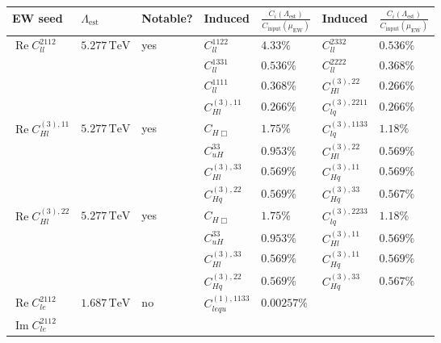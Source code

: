 \begin{table}[htbp]
    \centering
    \small
    \renewcommand{\arraystretch}{1.25}
    \begin{tabular}{lllllll}
        \toprule
        EW seed
        & \(\Lambda_{\mathrm{est}}\)
        & Notable?
        & Induced &$\tfrac{C_i(\Lambda_\text{est})}{C_\text{input}(\mu_\text{EW})}$ &Induced&$\tfrac{C_i(\Lambda_\text{est})}{C_\text{input}(\mu_\text{EW})}$
        \\
        \midrule
        \(\operatorname{Re}C_{ll}^{2112}\)
        & \(5.277\,\mathrm{TeV}\)
        & yes
        & \(C_{ll}^{1122}\)&\(4.33\%\)&
          \(C_{ll}^{2332}\)&\(0.536\%\)\\&&&
          \(C_{ll}^{1331}\)&\(0.536\%\)&
          \(C_{ll}^{2222}\)&\(0.368\%\)\\&&&
          \(C_{ll}^{1111}\)&\(0.368\%\)&
          \(C_{Hl}^{(3),22}\)&\(0.266\%\)\\&&&
          \(C_{Hl}^{(3),11}\)&\(0.266\%\)&
          \(C_{lq}^{(3),2211}\)&\(0.266\%\)
        \\\midrule
        \(\operatorname{Re}C_{Hl}^{(3),11}\)
        & \(5.277\,\mathrm{TeV}\)
        & yes
        & \(C_{H\Box}\)&\(1.75\%\)&
          \(C_{lq}^{(3),1133}\)&\(1.18\%\)\\&&&
          \(C_{uH}^{33}\)&\(0.953\%\)&
          \(C_{Hl}^{(3),22}\)&\(0.569\%\)\\&&&
          \(C_{Hl}^{(3),33}\)&\(0.569\%\)&
          \(C_{Hq}^{(3),11}\)&\(0.569\%\)\\&&&
          \(C_{Hq}^{(3),22}\)&\(0.569\%\)&
          \(C_{Hq}^{(3),33}\)&\(0.567\%\)
        \\\midrule
        \(\operatorname{Re}C_{Hl}^{(3),22}\)
        & \(5.277\,\mathrm{TeV}\)
        & yes
        & \(C_{H\Box}\)&\(1.75\%\)&
          \(C_{lq}^{(3),2233}\)&\(1.18\%\)\\&&&
          \(C_{uH}^{33}\)&\(0.953\%\)&
          \(C_{Hl}^{(3),11}\)&\(0.569\%\)\\&&&
          \(C_{Hl}^{(3),33}\)&\(0.569\%\)&
          \(C_{Hq}^{(3),11}\)&\(0.569\%\)\\&&&
          \(C_{Hq}^{(3),22}\)&\(0.569\%\)&
          \(C_{Hq}^{(3),33}\)&\(0.567\%\)
        \\\midrule
        \(\operatorname{Re}C_{le}^{2112}\)
        & \(1.687\,\mathrm{TeV}\)
        & no
        & \(C_{lequ}^{(1),1133}\)&\(0.00257\%\)&&
        \\\midrule
        \(\operatorname{Im}C_{le}^{2112}\)

\end{tabular}
\end{table}
